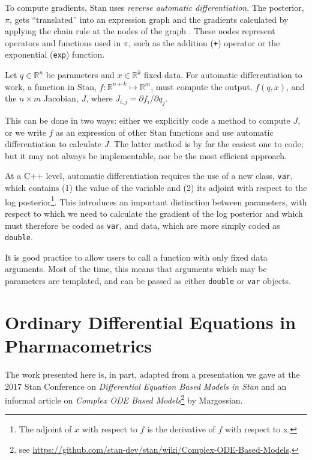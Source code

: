\documentclass[11pt]{amsart}
\begin{document}
To compute gradients, Stan uses \textit{reverse automatic differentiation}. The posterior, 
$\pi$, gets ``translated'' into an expression graph and the gradients calculated by 
applying the chain rule at the nodes of the graph \cite{Carpenter:2015}. These nodes represent 
operators and functions used in $\pi$, such as the addition (\texttt{+}) operator or 
the exponential (\texttt{exp}) function.

Let $q \in \mathbb{R}^n$ be parameters and $x \in \mathbb{R}^k$ fixed data. For 
automatic differentiation to work, a function in Stan, $f: \mathbb{R}^{n + k} \mapsto \mathbb{R}^m$, 
must compute the output, $f(q, x)$, and the $n \times m$ Jacobian, $J$, 
where $J_{i,j} = \partial f_i / \partial q_j$.

This can be done in two ways: either we explicitly code a method to compute $J$,
 or we write $f$ as an expression of other Stan functions and use automatic differentiation
  to calculate $J$. The latter method is by far the easiest one to code; but it may not always 
  be implementable, nor be the most efficient approach. 

At a C++ level, automatic differentiation requires the use of a new class, \texttt{var}, which
contains (1) the value of the variable and (2) its adjoint with respect to the log 
posterior\footnote{The adjoint of $x$ with respect to $f$ is the derivative of $f$
with respect to x.}. This introduces an important distinction between parameters,
with respect to which we need to calculate the gradient of the log posterior and 
which must therefore be coded as \texttt{var}, and data, which are more simply 
coded as \texttt{double}.

It is good practice to allow users to call a function with only fixed data arguments.
 Most of the time, this means that arguments which may be parameters are templated, 
 and can be passed as either \texttt{double} or \texttt{var} objects.

\clearpage

\section{Ordinary Differential Equations in Pharmacometrics}

The work presented here is, in part, adapted from a presentation we gave at the 2017 Stan 
Conference on \textit{Differential Equation Based Models in Stan} \cite{Margossian:2017}
and an informal article on \textit{Complex ODE Based Models}\footnote{see
\url{https://github.com/stan-dev/stan/wiki/Complex-ODE-Based-Models}.} by
Margossian.
\end{document}
